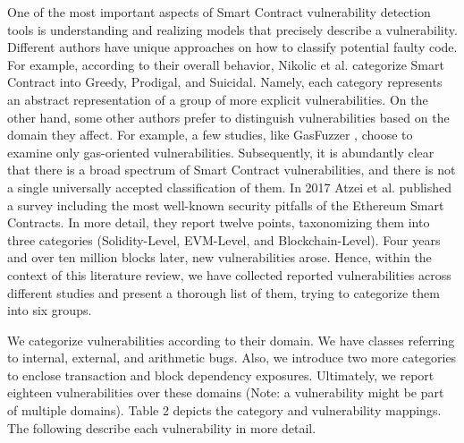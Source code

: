 \documentclass[a4paper,11pt]{article}
\begin{document}
One of the most important aspects of Smart Contract vulnerability detection
tools is understanding and realizing models that precisely describe a
vulnerability. Different authors have unique approaches on how to classify
potential faulty code. For example, according to their overall behavior,
Nikolic et al. \cite{nikolic2018finding} categorize Smart Contract into Greedy,
Prodigal, and Suicidal. Namely, each category represents an abstract
representation of a group of more explicit vulnerabilities. On the other hand,
some other authors prefer to distinguish vulnerabilities based on the domain
they affect. For example, a few studies, like GasFuzzer \cite{ashraf2020gasfuzzer}, choose to
examine only gas-oriented vulnerabilities. Subsequently, it is abundantly clear
that there is a broad spectrum of Smart Contract vulnerabilities, and there is
not a single universally accepted classification of them. In 2017 Atzei et al.
\cite{atzei2017survey} published a survey including the most well-known security pitfalls of the
Ethereum Smart Contracts. In more detail, they report twelve points,
taxonomizing them into three categories (Solidity-Level, EVM-Level, and
Blockchain-Level). Four years and over ten million blocks later, new
vulnerabilities arose. Hence, within the context of this literature review, we
have collected reported vulnerabilities across different studies and present a
thorough list of them, trying to categorize them into six groups.

We categorize vulnerabilities according to their domain. We have
classes referring to internal, external, and arithmetic bugs. Also, we
introduce two more categories to enclose transaction and block dependency
exposures. Ultimately, we report eighteen vulnerabilities over these domains
(Note: a vulnerability might be part of multiple domains). Table 2 depicts the
category and vulnerability mappings. The following describe each
vulnerability in more detail.
\end{document}
